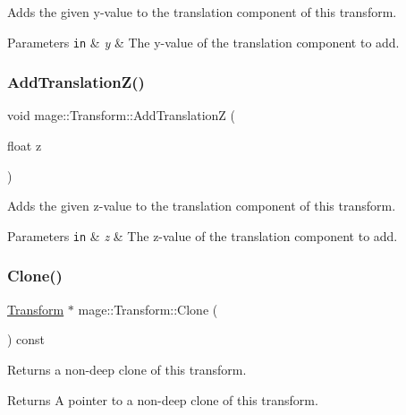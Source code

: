 Adds the given y-\/value to the translation component of this transform.


\begin{DoxyParams}[1]{Parameters}
\mbox{\tt in}  & {\em y} & The y-\/value of the translation component to add. \\
\hline
\end{DoxyParams}
\hypertarget{structmage_1_1_transform_a0553f72a6fcf38128d2201d54584f079}{}\label{structmage_1_1_transform_a0553f72a6fcf38128d2201d54584f079} 
\subsubsection{\texorpdfstring{Add\+Translation\+Z()}{AddTranslationZ()}}
{\footnotesize\ttfamily void mage\+::\+Transform\+::\+Add\+TranslationZ (\begin{DoxyParamCaption}\item[{float}]{z }\end{DoxyParamCaption})}

Adds the given z-\/value to the translation component of this transform.


\begin{DoxyParams}[1]{Parameters}
\mbox{\tt in}  & {\em z} & The z-\/value of the translation component to add. \\
\hline
\end{DoxyParams}
\hypertarget{structmage_1_1_transform_afdae6837c2c49e598a6aca1ceab5e561}{}\label{structmage_1_1_transform_afdae6837c2c49e598a6aca1ceab5e561} 
\subsubsection{\texorpdfstring{Clone()}{Clone()}}
{\footnotesize\ttfamily \hyperlink{structmage_1_1_transform}{Transform} $\ast$ mage\+::\+Transform\+::\+Clone (\begin{DoxyParamCaption}{ }\end{DoxyParamCaption}) const}

Returns a non-\/deep clone of this transform.

\begin{DoxyReturn}{Returns}
A pointer to a non-\/deep clone of this transform. 
\end{DoxyReturn}
\hypertarget{structmage_1_1_transform_af96fd453b15766d7fffae5d8bba8ba60}{}\label{structmage_1_1_transform_af96fd453b15766d7fffae5d8bba8ba60} 
